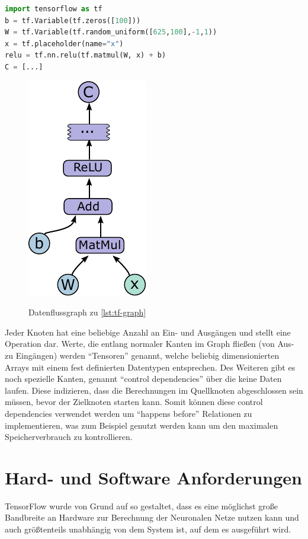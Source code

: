 \begin{minipage}{\linewidth}
\begin{lstlisting}[language=Python, label=lst:tf-graph, caption={Code-Beispiel zur Definition eines Graphen~\cite{tensorflow2015-whitepaper}}]
import tensorflow as tf
b = tf.Variable(tf.zeros([100]))
W = tf.Variable(tf.random_uniform([625,100],-1,1))
x = tf.placeholder(name="x")
relu = tf.nn.relu(tf.matmul(W, x) + b)
C = [...]
\end{lstlisting}
\end{minipage}

\begin{figure}[htb!]
	\centering
	 \includegraphics[width=.3\textwidth]{images/graph.pdf}\\
	\vspace{10pt} 
	\caption{Datenflussgraph zu \autoref{lst:tf-graph}~\cite{tensorflow2015-whitepaper}}
	\label{fig:dataflow}
\end{figure}

Jeder Knoten hat eine beliebige Anzahl an Ein- und Ausgängen und stellt eine Operation dar. Werte, die entlang normaler Kanten im Graph fließen (von Aus- zu Eingängen) werden "`Tensoren"' genannt, welche beliebig dimensionierten Arrays mit einem fest definierten Datentypen entsprechen. Des Weiteren gibt es noch spezielle Kanten, genannt "`control dependencies"' über die keine Daten laufen. Diese indizieren, dass die Berechnungen im Quellknoten abgeschlossen sein müssen, bevor der Zielknoten starten kann. Somit können diese control dependencies verwendet werden um "`happens before"' Relationen zu implementieren, was zum Beispiel genutzt werden kann um den maximalen Speicherverbrauch zu kontrollieren.

\section{Hard- und Software Anforderungen}
TensorFlow wurde von Grund auf so gestaltet, dass es eine möglichst große Bandbreite an Hardware zur Berechnung der Neuronalen Netze nutzen kann und auch größtenteils unabhängig von dem System ist, auf dem es ausgeführt wird.

